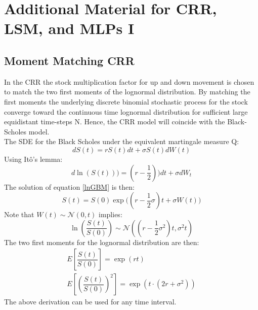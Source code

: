 
\chapter{Additional Material for CRR, LSM, and MLPs I} %

\label{AppendixC} %

\section{Moment Matching CRR}\label{CRRMM}
In the CRR the stock multiplication factor for up and down movement is chosen to match the two first moments of the lognormal distribution. By matching the first moments the underlying discrete binomial stochastic process for the stock converge toward the continuous time lognormal distribution for sufficient large equidistant time-steps N. Hence, the CRR model will coincide with the Black-Scholes model.\\

The SDE for the Black Scholes under the equivalent martingale measure Q:
$$dS(t)=rS(t)dt + \sigma S(t) dW(t)$$
Using Itô's lemma:
\begin{equation}\label{lnGBM}
d\ln(S(t)))=(r-\frac{1}{2}))dt + \sigma dW_t
\end{equation}
The solution of equation \ref{lnGBM} is then:
$$S(t)=S(0)\exp\bigg((r-\dfrac{1}{2}\sigma)t+ \sigma W(t) \bigg)$$
Note that $W(t)\sim \mathcal{N}(0,t)$ implies:
$$\ln(\dfrac{S(t)}{S(0)}) \sim \mathcal{N}((r-\dfrac{1}{2}\sigma^2)t, \sigma^2 t)$$
The two first moments for the lognormal distribution are then:
\begin{equation}\label{lnMoments}
\begin{split}
E[\dfrac{S(t)}{S(0)}]=\exp(rt)\\
E[(\dfrac{S(t)}{S(0)})^2]=\exp(t\cdot (2r + \sigma^2))
\end{split}
\end{equation}
The above derivation can be used for any time interval.\\

